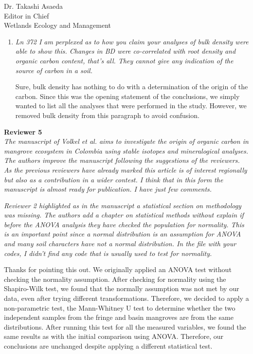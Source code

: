 \documentclass[11pt]{bgcletter}
\begin{document}
\begin{letter}{Dr. Takashi Asaeda\\
 Editor in Chief \\ Wetlands Ecology and Management}
\begin{enumerate}
{\color{blue} The sentence was completed to make the contrast clear as suggested.}

\item {\it Ln 372 I am perplexed as to how you claim your analyses of bulk density were able to show this. Changes in BD were co-correlated with root density and organic carbon content, that's all. They cannot give any indication of the source of carbon in a soil.}

{\color{blue} Sure, bulk density has nothing to do with a determination of the origin of the carbon. Since this was the opening statement of the conclusions, we simply wanted to list all the analyses that were performed in the study. However, we removed bulk density from this paragraph to avoid confusion.}

\end{enumerate}

\newpage
{\bf Reviewer 5} \\

{\it The manuscript of Volkel et al. aims to investigate the origin of organic carbon in mangrove ecosystem in Colombia using stable isotopes and mineralogical analyses. The authors improve the manuscript following the suggestions of the reviewers. As the previous reviewers have already marked this article is of interest regionally but also as a contribution in a wider contest. I think that in this form the manuscript is almost ready for publication. I have just few comments.}

{\it Reviewer 2 highlighted as in the manuscript a statistical section on methodology was missing. The authors add a chapter on statistical methods without explain if before the ANOVA analysis they have checked the population for normality. This is an important point since a normal distribution is an assumption for ANOVA and many soil characters have not a normal distribution. In the file with your codes, I didn't find any code that is usually used to test for normality.}

{\color{blue} Thanks for pointing this out. We originally applied an ANOVA test without checking the normality assumption. After checking for normality using the Shapiro-Wilk test, we found that the normally assumption was not met by our data, even after trying different transformations. Therefore, we decided to apply a non-parametric test, the Mann-Whitney U test to determine whether the two independent samples from the fringe and basin mangroves are from the same distributions. After running this test for all the measured variables, we found the same results as with the initial comparison using ANOVA. Therefore, our conclusions are unchanged despite applying a different statistical test. }


\end{letter}
\end{document}
